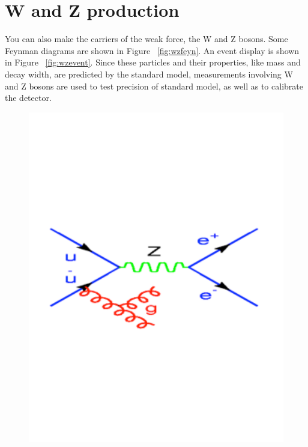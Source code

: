 \section{W and Z production}

You can also make the carriers of the weak force, the W and Z bosons.  Some Feynman diagrams are shown in Figure ~\ref{fig:wzfeyn}.
An event display is shown in Figure ~\ref{fig:wzevent}. Since these particles and their properties, like mass and decay width, are predicted by the standard model, measurements involving W and Z bosons are used to test precision of standard model, as well as to calibrate the detector. 


\begin{figure}[h]
\centering\includegraphics[scale=0.2]{./protonprotoncollisions/Pictures/wz1.pdf}

\end{figure}
